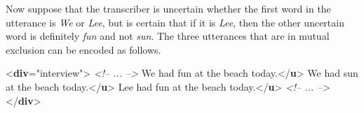 Now suppose that the transcriber is uncertain whether the first word in the utterance is \textit{We} or \textit{Lee}, but is certain that if it is \textit{Lee}, then the other uncertain word is definitely \textit{fun} and not \textit{sun}. The three utterances that are in mutual exclusion can be encoded as follows. \par\bgroup{}\exampleFont \begin{shaded}\noindent\mbox{}{<\textbf{div}\hspace*{1em}{type}="{interview}">}\mbox{}\newline 
\textit{<!-- ... -->}\mbox{}\newline 
{}We had fun at the beach today.{</\textbf{u}>}\mbox{}\newline 
{}We had sun at the beach today.{</\textbf{u}>}\mbox{}\newline 
{}Lee had fun at the beach today.{</\textbf{u}>}\mbox{}\newline 
\textit{<!-- ... -->}\mbox{}\newline 
{</\textbf{div}>}\end{shaded}\egroup\par \par
